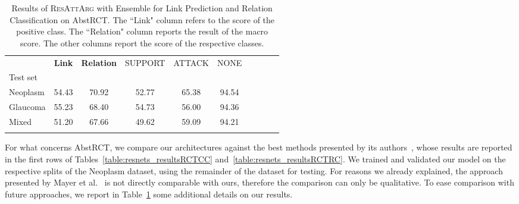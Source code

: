 \documentclass[journal]{IEEEtran}
\begin{document}
\begin{table}[t]
\centering
 \caption[Results of \textsc{ResAttArg} with Ensemble for Link Prediction and Relation Classification on AbstRCT.]{Results of \textsc{ResAttArg} with Ensemble for Link Prediction and Relation Classification on AbstRCT. The ``Link" column refers to the  score of the positive class. The ``Relation" column reports the result of the macro  score. The other columns report the  score of the respective classes.}
 \label{table:resnets_resultsRCTRCex}
 \begin{tabular}{lccccccccc}
 \noalign{\smallskip}
 \hline
 \noalign{\smallskip}
    & \textbf{Link} &   \textbf{Relation}    & SUPPORT &   ATTACK  & NONE \\
    Test set    &  &   &  &      \\
 \noalign{\smallskip}
 \hline
 \noalign{\smallskip}
Neoplasm	&	54.43	&   70.92    &	52.77	&	65.38   &   94.54	\\
Glaucoma	&	55.23	&   68.40   &	54.73	&	56.00   &   94.36	\\
Mixed	&	51.20	&    67.66   &	49.62	&	59.09   &    94.21	\\

\noalign{\smallskip}
 \hline
 \end{tabular}
\end{table}

For what concerns AbstRCT, we compare our architectures against the best methods presented by its authors~\cite{DBLP:conf/ecai/0002CV20}, whose results are reported in the first rows of Tables~\ref{table:resnets_resultsRCTCC} and~\ref{table:resnets_resultsRCTRC}.
We trained and validated our model on the respective splits of the Neoplasm dataset, using the remainder of the dataset for testing.
For reasons we already explained, the approach presented by Mayer et al.~\cite{DBLP:conf/ecai/0002CV20} is not directly comparable with ours, therefore the comparison can only be qualitative.
To ease comparison with future approaches, we report in Table~\ref{table:resnets_resultsRCTRCex} some additional details on our results.
\end{document}
